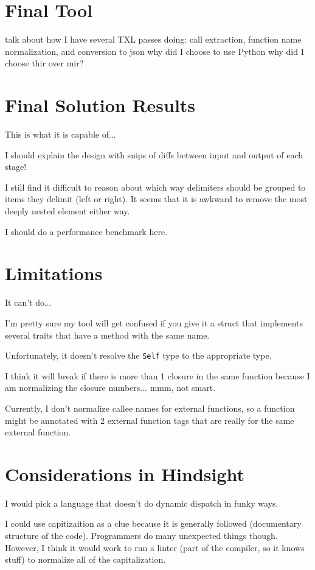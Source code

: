\documentclass[11pt]{article}
\begin{document}
\section{Final Tool} %
talk about how I have several TXL passes doing: call extraction, function name normalization, and conversion to json
why did I choose to use Python
why did I choose thir over mir?

\section{Final Solution Results}
This is what it is capable of...

I should explain the design with snips of diffs between input and output of each stage!

I still find it difficult to reason about which way delimiters should be grouped to items they delimit (left or right).
It seems that it is awkward to remove the most deeply nested element either way.

I should do a performance benchmark here.

\section{Limitations}
It can't do...

I'm pretty sure my tool will get confused if you give it a struct that implements several traits that have a method with the same name.

Unfortunately, it doesn't resolve the \lstinline{Self} type to the appropriate type.

I think it will break if there is more than 1 closure in the same function because I am normalizing the closure numbers... mmm, not smart.

Currently, I don't normalize callee names for external functions, so a function might be annotated with 2 external function tags that are really for the same external function.

\section{Considerations in Hindsight}
I would pick a language that doesn't do dynamic dispatch in funky ways.

I could use capitizaition as a clue because it is generally followed (documentary structure of the code).
Programmers do many unexpected things though.
However, I think it would work to run a linter (part of the compiler, so it knows stuff) to normalize all of the capitalization.
\end{document}

